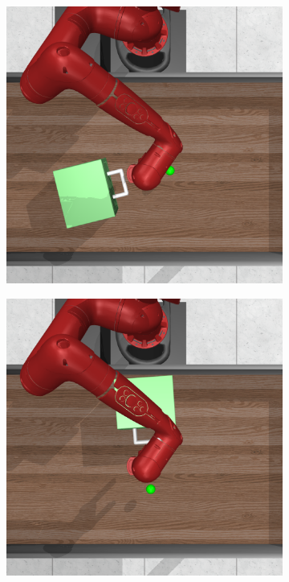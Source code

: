 \begin{figure}[h]
    \centering
    \begin{subfigure}{.3\textwidth}
        \centering
        \includegraphics[width=\linewidth]{figures/pos1.png}
    \end{subfigure}
    \begin{subfigure}{.3\textwidth}
        \centering
        \includegraphics[width=\linewidth]{figures/pos2.png}

\end{subfigure}
\end{figure}
